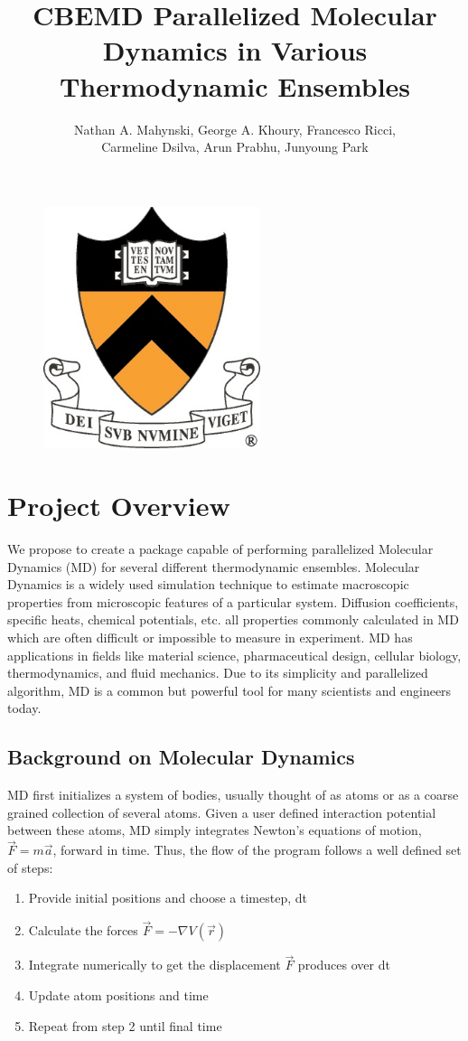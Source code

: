 \documentclass[10pt]{article}
\title{\textbf{CBEMD} Parallelized Molecular Dynamics in Various Thermodynamic Ensembles}
\author{Nathan A. Mahynski, George A. Khoury, Francesco Ricci, \\Carmeline Dsilva, Arun Prabhu, Junyoung Park}
\date{}
\begin{document}
\maketitle
\begin{figure}[htbp]
   \centering
   \includegraphics[width=2.5in]{princeton.jpg}
\end{figure}
\thispagestyle{empty}
\newpage
\setcounter{page}{1}
\newpage

\section{Project Overview}
We propose to create a package capable of performing parallelized Molecular Dynamics (MD) for several different thermodynamic ensembles. Molecular Dynamics is a widely used simulation technique to estimate macroscopic properties from microscopic features of a particular system. Diffusion coefficients, specific heats, chemical potentials, etc. all properties commonly calculated in MD which are often difficult or impossible to measure in experiment.  MD has applications in fields like material science, pharmaceutical design, cellular biology, thermodynamics, and fluid mechanics.  Due to its simplicity and parallelized algorithm, MD is a common but powerful tool for many scientists and engineers today.

\subsection{Background on Molecular Dynamics}
MD first initializes a system of bodies, usually thought of as atoms or as a coarse grained collection of several atoms.  Given a user defined interaction potential between these atoms, MD simply integrates Newton's equations of motion, $\overrightarrow{F}=m\overrightarrow{a}$, forward in time.  Thus, the flow of the program follows a well defined set of steps:
\begin{enumerate}
    \item Provide initial positions and choose a timestep, dt
    \item Calculate the forces $\overrightarrow{F} =  -\nabla V (\overrightarrow{r}) $
    \item Integrate numerically to get the displacement $\overrightarrow{F}$ produces over dt
    \item Update atom positions and time
    \item Repeat from step 2 until final time
\end{enumerate}
\end{document}
